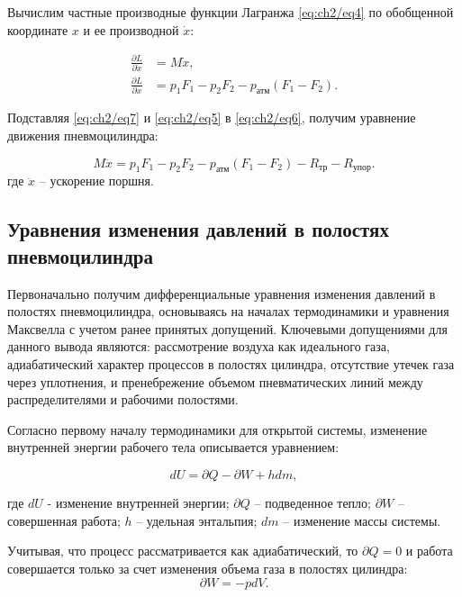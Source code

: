Вычислим частные производные функции Лагранжа \eqref{eq:ch2/eq4} по обобщенной координате $x$ и ее производной $\dot{x}$:

\begin{equation}
\label{eq:ch2/eq7}
    \begin{aligned}
        \frac{\partial L}{\partial \dot{x}} & = M \dot{x},                                    \\
        \frac{\partial L}{\partial x}       & = p_1 F_1 - p_2 F_2 - p_\text{атм} (F_1 - F_2).
    \end{aligned}
\end{equation}

Подставляя \eqref{eq:ch2/eq7} и \eqref{eq:ch2/eq5} в \eqref{eq:ch2/eq6}, получим уравнение движения пневмоцилиндра:

\begin{equation}
\label{eq:ch2/eq8}
    M \ddot{x} = p_1 F_1 - p_2 F_2 - p_\text{атм} (F_1 - F_2) - R_{\text{тр}} - R_{\text{упор}}.
\end{equation}
где $\ddot{x}$ -- ускорение поршня.

\subsection{Уравнения изменения давлений в полостях пневмоцилиндра}\label{sec:ch2/sec2/subsec2}

Первоначально получим дифференциальные уравнения изменения давлений в
полостях пневмоцилиндра, основываясь на началах термодинамики
и уравнения Максвелла с учетом ранее принятых допущений.
Ключевыми допущениями для данного вывода являются: рассмотрение
воздуха как идеального газа, адиабатический характер процессов в полостях
цилиндра, отсутствие утечек газа через уплотнения, и пренебрежение объемом
пневматических линий между распределителями и рабочими полостями.

Согласно первому началу термодинамики для открытой системы, изменение внутренней энергии рабочего тела описывается уравнением:

\begin{equation}
\label{eq:ch2/first_law}
    dU = \partial Q - \partial W + hdm,
\end{equation}

где $dU$ - изменение внутренней энергии;
$\partial Q$ -- подведенное тепло;
$\partial W$ -- совершенная работа;
$h$ -- удельная энтальпия;
$dm$ -- изменение массы системы.

Учитывая, что процесс рассматривается как адиабатический,
то $\partial Q = 0$ и работа совершается только за счет изменения объема газа в полостях цилиндра:
\begin{equation}
\label{eq:ch2/work}
    \partial W = -pdV.
\end{equation}

